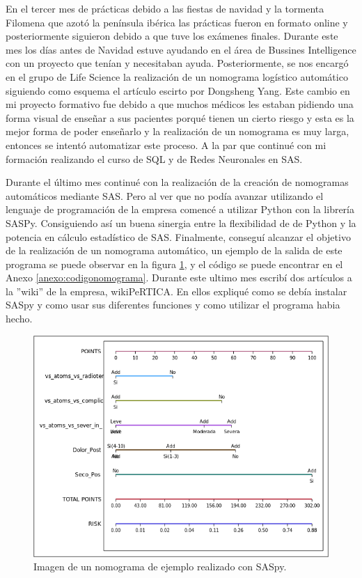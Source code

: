 \documentclass[pdftex,11pt,a4paper]{book}
\begin{document}
En el tercer mes de prácticas debido a las fiestas de navidad y la tormenta Filomena que azotó la península ibérica las prácticas fueron en formato online y posteriormente siguieron debido a que tuve los exámenes finales. Durante este mes los días antes de Navidad estuve ayudando en el área de Bussines Intelligence con un proyecto que tenían y necesitaban ayuda. 
Posteriormente, se nos encargó en el grupo de Life Science la realización de un nomograma logístico automático siguiendo como esquema el artículo escirto por Dongsheng Yang. Este cambio en mi proyecto formativo fue debido a que muchos médicos les estaban pidiendo una forma visual de enseñar a sus pacientes porqué tienen un cierto riesgo y esta es la mejor forma de poder enseñarlo y la realización de un nomograma es muy larga, entonces se intentó automatizar este proceso. A la par que continué con mi formación realizando el curso de SQL y de Redes Neuronales en SAS. \cite{nomograma}


Durante el último mes continué con la realización de la creación de nomogramas automáticos mediante SAS. Pero al ver que no podía avanzar utilizando el lenguaje de programación de la empresa comencé a utilizar Python con la librería SASPy. Consiguiendo así un buena sinergia entre la flexibilidad de de Python y la potencia en cálculo estadístico de SAS. Finalmente, conseguí alcanzar  el objetivo de la realización de un nomograma automático, un ejemplo de la salida de este programa se puede observar en la figura \ref{fig:nomogramaSASpy}, y el código se puede encontrar en el Anexo \ref{anexo:codigonomograma}.
Durante este ultimo mes escribí dos artículos a la ''wiki'' de la empresa, wikiPeRTICA. En ellos expliqué como se debía instalar SASpy y como usar sus diferentes funciones y como utilizar el programa habia hecho.

\begin{figure}
\begin{center}
\includegraphics[scale=0.45]{SVG.png}
\caption{Imagen de un nomograma de ejemplo realizado con SASpy.}
\label{fig:nomogramaSASpy}
\end{center}
\end{figure}
\end{document}
